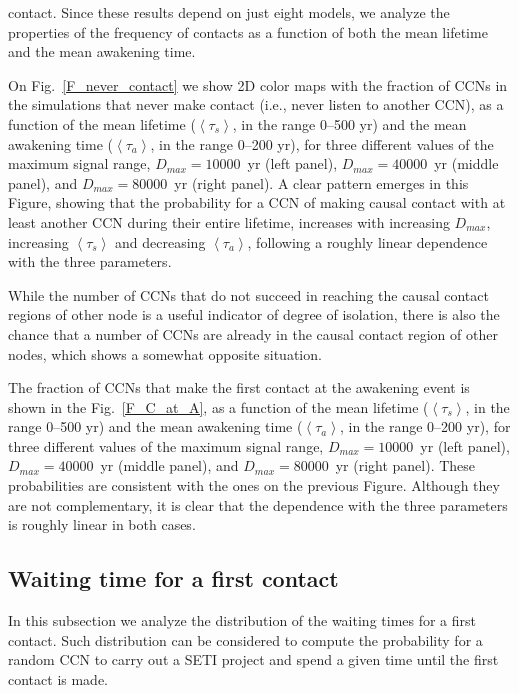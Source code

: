\documentclass[crop]{CSLB}
\newcommand{\ceti}{CCN}
\newcommand{\cetis}{CCNs}
\newcommand{\ffn}[1]{}
\begin{document}
contact.
%
Since these results depend on just eight models, we analyze the
properties of the frequency of contacts as a function of both the mean
lifetime and the mean awakening time.
%
\ffn{4}
%
On Fig.~\ref{F_never_contact} we show 2D color maps with the fraction
of \cetis{} in the simulations that never make contact (i.e., never
listen to another \ceti{}), as a function of the mean lifetime
($\left<\tau_s\right>$, in the range 0--500 yr) and the mean awakening
time ($\left<\tau_a\right>$, in the range 0--200 yr), for three
different values of the maximum signal range, $D_{max}=10000$~yr (left
panel), $D_{max}=40000$~yr (middle panel), and $D_{max}=80000$~yr
(right panel).
%
A clear pattern emerges in this Figure, showing that the probability
for a \ceti{} of making causal contact with at least another \ceti{}
during their entire lifetime, increases with increasing $D_{max}$,
increasing $\left<\tau_s\right>$ and decreasing $\left<\tau_a\right>$,
following a roughly linear dependence with the three parameters.


While the number of \cetis{} that do not succeed in reaching the
causal contact regions of other node is a useful indicator of
degree of isolation, there is also the chance that a number of
\cetis{} are already in the causal contact region of other nodes,
which shows a somewhat opposite situation.
%
\ffn{5}
%
The fraction of \cetis{} that make the first contact at the awakening
event is shown in the Fig.~\ref{F_C_at_A}, 
as a function of the mean lifetime
($\left<\tau_s\right>$, in the range 0--500 yr) and the mean awakening
time ($\left<\tau_a\right>$, in the range 0--200 yr), for three
different values of the maximum signal range, $D_{max}=10000$~yr (left
panel), $D_{max}=40000$~yr (middle panel), and $D_{max}=80000$~yr
(right panel).
%
These probabilities are consistent with the ones on the previous
Figure.
%
Although they are not complementary, it is clear that the dependence
with the three parameters is roughly linear in both cases.
%


%


\subsection{Waiting time for a first contact}\label{SS_waiting}

In this subsection we analyze the distribution of the waiting times for
a first contact.
%
Such distribution can be considered to compute the probability for a
random \ceti{} to carry out a SETI project and spend a given time until
the first contact is made. 
\end{document}
